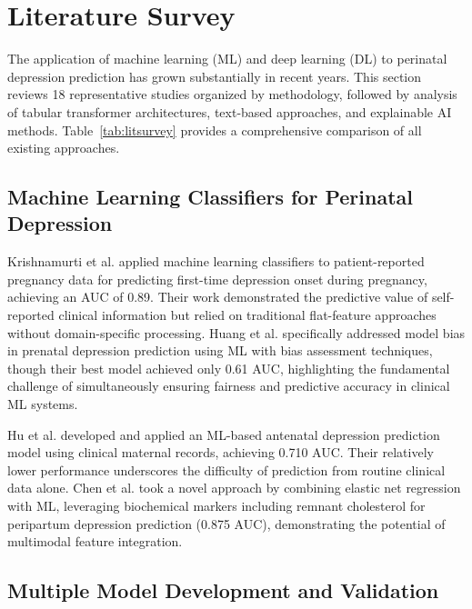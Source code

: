 \documentclass[12pt,a4paper]{article}
\begin{document}
\section{Literature Survey}

The application of machine learning (ML) and deep learning (DL) to perinatal depression prediction has grown substantially in recent years. This section reviews 18 representative studies organized by methodology, followed by analysis of tabular transformer architectures, text-based approaches, and explainable AI methods. Table~\ref{tab:litsurvey} provides a comprehensive comparison of all existing approaches.

\subsection{Machine Learning Classifiers for Perinatal Depression}

Krishnamurti et al.\cite{krishnamurti2024} applied machine learning classifiers to patient-reported pregnancy data for predicting first-time depression onset during pregnancy, achieving an AUC of 0.89. Their work demonstrated the predictive value of self-reported clinical information but relied on traditional flat-feature approaches without domain-specific processing. Huang et al.\cite{huang2024bias} specifically addressed model bias in prenatal depression prediction using ML with bias assessment techniques, though their best model achieved only 0.61 AUC, highlighting the fundamental challenge of simultaneously ensuring fairness and predictive accuracy in clinical ML systems.

Hu et al.\cite{hu2025} developed and applied an ML-based antenatal depression prediction model using clinical maternal records, achieving 0.710 AUC. Their relatively lower performance underscores the difficulty of prediction from routine clinical data alone. Chen et al.\cite{chen2025} took a novel approach by combining elastic net regression with ML, leveraging biochemical markers including remnant cholesterol for peripartum depression prediction (0.875 AUC), demonstrating the potential of multimodal feature integration.

\subsection{Multiple Model Development and Validation}
\end{document}
